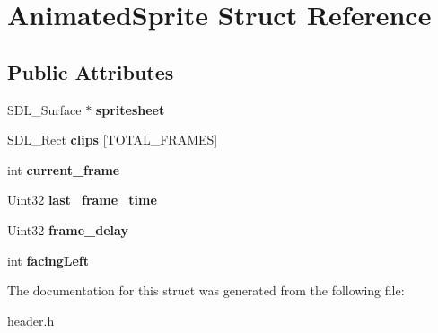 \hypertarget{structAnimatedSprite}{}\section{Animated\+Sprite Struct Reference}
\label{structAnimatedSprite}
\subsection*{Public Attributes}
\begin{DoxyCompactItemize}
\item 
\mbox{\label{structAnimatedSprite_a27cb96c65de531dad610ae4874479a33}} 
S\+D\+L\+\_\+\+Surface $\ast$ {\bfseries spritesheet}
\item 
\mbox{\label{structAnimatedSprite_ad78cd918a5b05a95beb286e6b6d138e4}} 
S\+D\+L\+\_\+\+Rect {\bfseries clips} \mbox{[}T\+O\+T\+A\+L\+\_\+\+F\+R\+A\+M\+ES\mbox{]}
\item 
\mbox{\label{structAnimatedSprite_a59bce95aa316e3a327a96dcd1fe945b3}} 
int {\bfseries current\+\_\+frame}
\item 
\mbox{\label{structAnimatedSprite_ac24913de61be8e53c0b63acb58b30ca9}} 
Uint32 {\bfseries last\+\_\+frame\+\_\+time}
\item 
\mbox{\label{structAnimatedSprite_aac6b3af9fd7075bdef303c025b5a2035}} 
Uint32 {\bfseries frame\+\_\+delay}
\item 
\mbox{\label{structAnimatedSprite_ae0e283c0401edea10ed6a7dd46a7296e}} 
int {\bfseries facing\+Left}
\end{DoxyCompactItemize}


The documentation for this struct was generated from the following file\+:\begin{DoxyCompactItemize}
\item 
header.\+h\end{DoxyCompactItemize}
